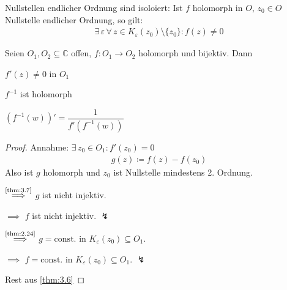 \documentclass[a4paper,10pt]{scrbook}
\begin{document}

\begin{notice}[Folgerung:] \label{thm:3.8}
  Nullstellen endlicher Ordnung sind isoloiert: Ist $f$ holomorph in $O$, $z_0 \in O$ Nullstelle endlicher Ordnung, so gilt:
  \begin{align*}
    \exists \, \varepsilon \, \forall \, z \in K_\varepsilon(z_0) \setminus \{ z_0\} : f(z) \neq 0
  \end{align*}
\end{notice}

\begin{theorem} \label{thm:3.9}
  Seien $O_1, O_2 \subseteq \mathbb{C}$ offen, $f : O_1 \to O_2$ holomorph und bijektiv. Dann
  \begin{item-triangle}
    \item $f'(z) \neq 0$ in $O_1$

    \item $f^{-1}$ ist holomorph

    \item $\left(f^{-1}(w)\right)' = \dfrac{1}{f'(f^{-1}(w))}$
  \end{item-triangle}

  \begin{proof}
    Annahme: $\exists \, z_0 \in O_1 : f'(z_0) = 0$
    \begin{align*}
      g(z) \coloneq f(z) - f(z_0)
    \end{align*}
    Also ist $g$ holomorph und $z_0$ ist Nullstelle mindestens 2. Ordnung.


    $\overset{\text{\ref{thm:3.7}}}{\implies}$ $g$ ist nicht injektiv.

    $\implies$ $f$ ist nicht injektiv. $\lightning$


    $\overset{\text{\ref{thm:2.24}}}{\implies}$ $g = \mathrm{const.}$ in $K_\varepsilon(z_0) \subseteq O_1$.

    $\implies$ $f = \mathrm{const.}$ in $K_\varepsilon(z_0) \subseteq O_1$. $\lightning$

    Rest aus \ref{thm:3.6}
  \end{proof}
\end{theorem}
\end{document}
